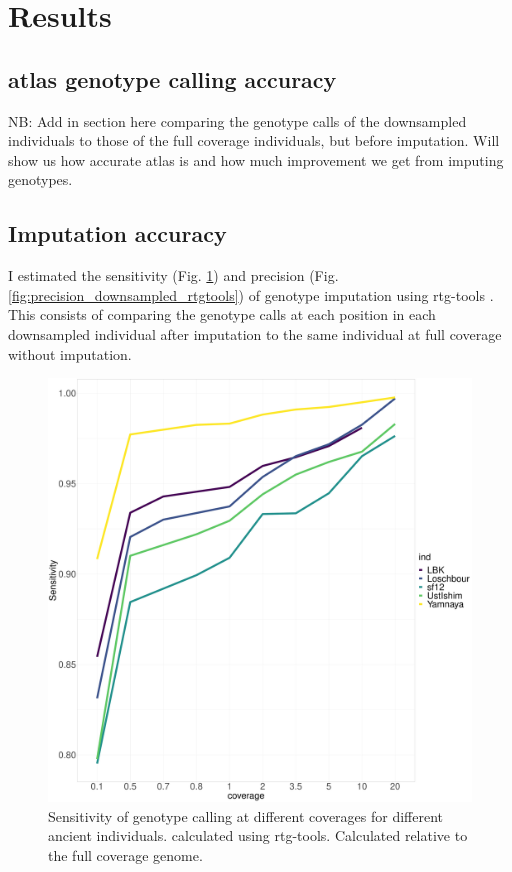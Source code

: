 \section{Results}

\subsection{atlas genotype calling accuracy}

NB: Add in section here comparing the genotype calls of the downsampled individuals to those of the full coverage individuals, but before imputation. Will show us how accurate atlas is and how much improvement we get from imputing genotypes.  

\subsection{Imputation accuracy}

I estimated the sensitivity (Fig. \ref{fig:Sensitivity_downsampled_rtgtools}) and precision (Fig.  \ref{fig:precision_downsampled_rtgtools}) of genotype imputation using rtg-tools \cite{cleary2014joint}. This consists of comparing the genotype calls at each position in each downsampled individual after imputation to the same individual at full coverage without imputation.

\begin{figure}[htp]
    \centering
    \includegraphics[width=1.0\textwidth]{../images/chapter1/allDownsampled_rtgtools_sensitivity.pdf}
    \caption{Sensitivity of genotype calling at different coverages for different ancient individuals.  calculated using rtg-tools. Calculated relative to the full coverage genome.}
    \label{fig:Sensitivity_downsampled_rtgtools}
\end{figure}

